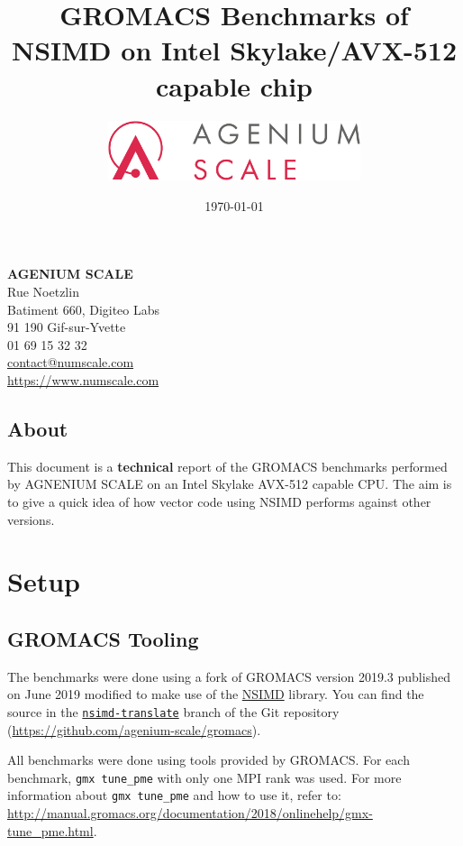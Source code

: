 \documentclass[a4paper,11pt]{article}
\date{\today}
\author{\includegraphics[width=20em]{logo_agenium_scale}}
\title{GROMACS Benchmarks of NSIMD on Intel Skylake/AVX-512 capable chip}
\newcommand{\gromacs}{GROMACS}
\newcommand{\nsimd}{NSIMD}
\newcommand{\cpu}{CPU}
\begin{document}
\maketitle%
\vspace*{\fill}%
\noindent%
\textbf{AGENIUM SCALE}\\
Rue Noetzlin\\
Batiment 660, Digiteo Labs\\
91 190 Gif-sur-Yvette\\
01 69 15 32 32\\
\href{mailto://contact@numscale.com}{contact@numscale.com}\\
\href{https://www.numscale.com}{https://www.numscale.com}\\
\thispagestyle{empty}
\clearpage
%
\thispagestyle{empty}
\tableofcontents
\newpage

\subsection*{About}%
\label{sec:about}

This document is a \textbf{technical} report of the \gromacs{} benchmarks performed by AGNENIUM SCALE on an Intel Skylake AVX-512 capable \cpu. The aim is to give a quick idea of how vector code using \nsimd{} performs against other versions.

\section{Setup}%
\label{sec:setup}

\subsection{\gromacs{} Tooling}

The benchmarks were done using a fork of \gromacs{} version 2019.3 published on June 2019 modified to make use of the \href{https://github.com/agenium-scale/nsimd#nsimd}{\nsimd{}} library. You can find the source in the \href{https://github.com/agenium-scale/gromacs/tree/nsimd-translate}{\texttt{nsimd-translate}} branch of the Git repository (\href{https://github.com/agenium-scale/gromacs}{https://github.com/agenium-scale/gromacs}).

All benchmarks were done using tools provided by \gromacs{}. For each benchmark, \texttt{gmx tune\_pme} with only one MPI rank was used. For more information about \texttt{gmx tune\_pme} and how to use it, refer to:
\href{http://manual.gromacs.org/documentation/2018/onlinehelp/gmx-tune_pme.html}{http://manual.\allowbreak{}gromacs.org/documentation/2018/onlinehelp/gmx-tune\_pme.html}.
\end{document}
